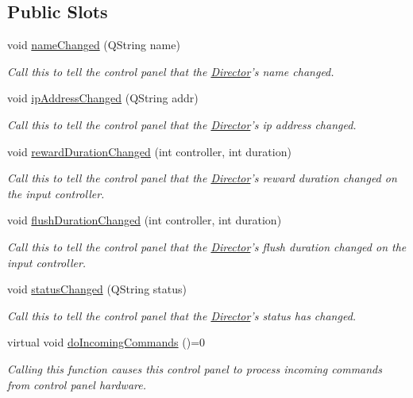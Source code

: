 \subsection*{Public Slots}
\begin{DoxyCompactItemize}
\item 
void \hyperlink{class_control_panel_interface_ae4fe9e651aa3b8eafeea50762292ceb2}{name\-Changed} (Q\-String name)
\begin{DoxyCompactList}\small\item\em Call this to tell the control panel that the \hyperlink{class_director}{Director}'s name changed. \end{DoxyCompactList}\item 
void \hyperlink{class_control_panel_interface_acd712ae5b62e9d32d269ada35f4bf026}{ip\-Address\-Changed} (Q\-String addr)
\begin{DoxyCompactList}\small\item\em Call this to tell the control panel that the \hyperlink{class_director}{Director}'s ip address changed. \end{DoxyCompactList}\item 
void \hyperlink{class_control_panel_interface_ac3c6750d8f96e095fae229583dd7122c}{reward\-Duration\-Changed} (int controller, int duration)
\begin{DoxyCompactList}\small\item\em Call this to tell the control panel that the \hyperlink{class_director}{Director}'s reward duration changed on the input controller. \end{DoxyCompactList}\item 
void \hyperlink{class_control_panel_interface_a40bc0fe90a3a339d9b934ac253823902}{flush\-Duration\-Changed} (int controller, int duration)
\begin{DoxyCompactList}\small\item\em Call this to tell the control panel that the \hyperlink{class_director}{Director}'s flush duration changed on the input controller. \end{DoxyCompactList}\item 
void \hyperlink{class_control_panel_interface_a92942ce52b74c7e9d96fe05f5987ef50}{status\-Changed} (Q\-String status)
\begin{DoxyCompactList}\small\item\em Call this to tell the control panel that the \hyperlink{class_director}{Director}'s status has changed. \end{DoxyCompactList}\item 
virtual void \hyperlink{class_control_panel_interface_a405de6656ffb2e4ac404595e783125fb}{do\-Incoming\-Commands} ()=0
\begin{DoxyCompactList}\small\item\em Calling this function causes this control panel to process incoming commands from control panel hardware. \end{DoxyCompactList}\end{DoxyCompactItemize}
